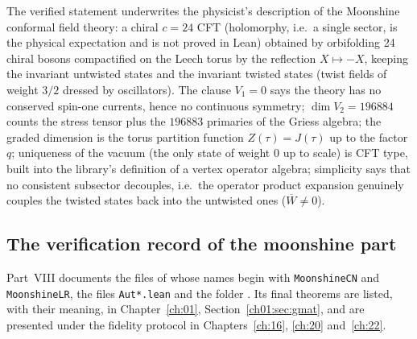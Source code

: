 \begin{physics}
The verified statement underwrites the physicist's description of the Moonshine conformal field
theory: a chiral $c=24$ CFT (holomorphy, i.e.\ a single sector, is the physical expectation and is
not proved in Lean) obtained by orbifolding 24 chiral bosons
compactified on the Leech torus by the reflection $X\mapsto -X$, keeping the invariant untwisted
states and the invariant twisted states (twist fields of weight $3/2$ dressed by oscillators). The
clause $V_1=0$ says the theory has no conserved spin-one currents, hence no continuous symmetry;
$\dim V_2=196884$ counts the stress tensor plus the $196883$ primaries of the Griess algebra; the
graded dimension is the torus partition function $Z(\tau)=J(\tau)$ up to the factor $q$; uniqueness of
the vacuum (the only state of weight $0$ up to scale) is CFT type, built into the library's definition
of a vertex operator algebra; simplicity says that no consistent subsector decouples, i.e.\ the operator product expansion genuinely couples the twisted states
back into the untwisted ones ($\overline W\neq 0$).
\end{physics}

\subsection{The verification record of the moonshine part}\label{ch15:sec:moonrecord}

Part~VIII documents the files of  whose names begin with \texttt{MoonshineCN} and \texttt{MoonshineLR}, the files \texttt{Aut*.lean} and the folder
. Its final theorems are listed, with their meaning, in Chapter~\ref{ch:01},
Section~\ref{ch01:sec:gmat}, and are presented under the fidelity protocol in Chapters~\ref{ch:16}, \ref{ch:20}
and~\ref{ch:22}.

